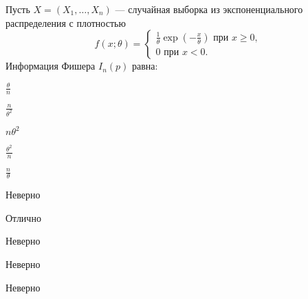 
\begin{question}
Пусть \(X = (X_1, \ldots , X_n)\) --- случайная выборка из
экспоненциального распределения с плотностью \[
f(x; \theta) =
\begin{cases}
\frac{1}{\theta}\exp(-\frac{x}{\theta}) \text{ при } x \geq 0,  \\
0 \text{ при } x < 0.
\end{cases}
\] Информация Фишера \(I_n(p)\) равна:
\begin{answerlist}
  \item \(\frac{\theta}{n}\)
  \item \(\frac{n}{\theta^2}\)
  \item \(n \theta^2\)
  \item \(\frac{\theta^2}{n}\)
  \item \(\frac{n}{\theta}\)
\end{answerlist}
\end{question}

\begin{solution}
\begin{answerlist}
  \item Неверно
  \item Отлично
  \item Неверно
  \item Неверно
  \item Неверно
\end{answerlist}
\end{solution}

